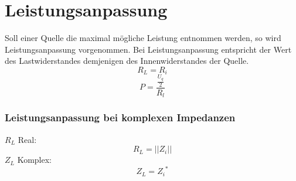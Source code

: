 



\section{Leistungsanpassung}
Soll einer Quelle die maximal mögliche Leistung entnommen werden, so wird 
Leistungsanpassung vorgenommen. Bei Leistungsanpassung entspricht der Wert des 
Lastwiderstandes demjenigen des Innenwiderstandes der Quelle. 
\[ R_L = R_i \]
\[ P = \frac{\frac{U_q}{2}}{R_l} \]

\subsubsection{Leistungsanpassung bei komplexen Impedanzen}
$R_L$ Real: 
\[ R_L = ||Z_i|| \]
$Z_L$ Komplex: 
\[ Z_L = {Z_i}^* \]
